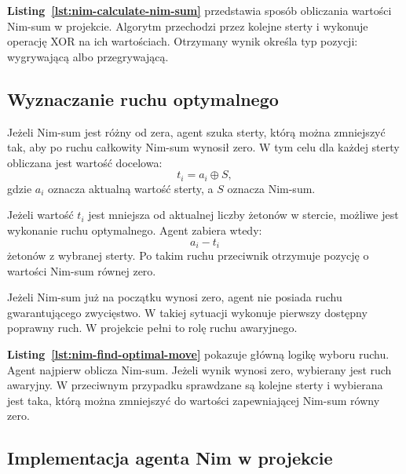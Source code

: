 \textbf{Listing~\ref{lst:nim-calculate-nim-sum}} przedstawia sposób obliczania wartości Nim-sum w projekcie. Algorytm przechodzi przez kolejne sterty i wykonuje operację XOR na ich wartościach. Otrzymany wynik określa typ pozycji: wygrywającą albo przegrywającą.

\subsection{Wyznaczanie ruchu optymalnego}

Jeżeli Nim-sum jest różny od zera, agent szuka sterty, którą można zmniejszyć tak, aby po ruchu całkowity Nim-sum wynosił zero. W tym celu dla każdej sterty obliczana jest wartość docelowa:
\begin{equation*}
t_i = a_i \oplus S,
\end{equation*}
gdzie $a_i$ oznacza aktualną wartość sterty, a $S$ oznacza Nim-sum.

Jeżeli wartość $t_i$ jest mniejsza od aktualnej liczby żetonów w stercie, możliwe jest wykonanie ruchu optymalnego. Agent zabiera wtedy:
\begin{equation*}
a_i - t_i
\end{equation*}
żetonów z wybranej sterty. Po takim ruchu przeciwnik otrzymuje pozycję o wartości Nim-sum równej zero.

Jeżeli Nim-sum już na początku wynosi zero, agent nie posiada ruchu gwarantującego zwycięstwo. W takiej sytuacji wykonuje pierwszy dostępny poprawny ruch. W projekcie pełni to rolę ruchu awaryjnego.

\newpage



\textbf{Listing~\ref{lst:nim-find-optimal-move}} pokazuje główną logikę wyboru ruchu. Agent najpierw oblicza Nim-sum. Jeżeli wynik wynosi zero, wybierany jest ruch awaryjny. W przeciwnym przypadku sprawdzane są kolejne sterty i wybierana jest taka, którą można zmniejszyć do wartości zapewniającej Nim-sum równy zero.

\subsection{Implementacja agenta Nim w projekcie}

